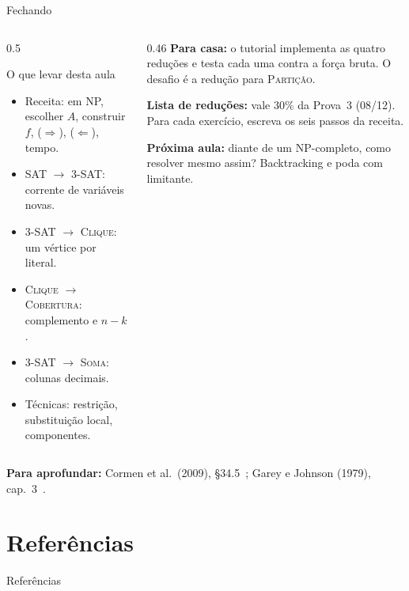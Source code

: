\documentclass[aspectratio=169,xcolor=table]{beamer}
\newcommand{\fonte}[1]{%
  \vfill
  {\tiny\color{gray!55!black}\textbf{Para aprofundar:} #1\par}%
}
\newcommand{\prob}[1]{\textsc{#1}}
\begin{document}
\begin{frame}{Fechando}
  \begin{columns}[T]
    \begin{column}{0.5\textwidth}
      \begin{block}{O que levar desta aula}
        \scriptsize
        \begin{itemize}
          \item Receita: em NP, escolher $A$, construir $f$, ($\Rightarrow$), ($\Leftarrow$),
                tempo.
          \item \prob{SAT} $\to$ \prob{3-SAT}: corrente de variáveis novas.
          \item \prob{3-SAT} $\to$ \prob{Clique}: um vértice por literal.
          \item \prob{Clique} $\to$ \prob{Cobertura}: complemento e $n - k$.
          \item \prob{3-SAT} $\to$ \prob{Soma}: colunas decimais.
          \item Técnicas: restrição, substituição local, componentes.
        \end{itemize}
      \end{block}
    \end{column}
    \begin{column}{0.46\textwidth}
      \scriptsize
      \textbf{Para casa:} o tutorial implementa as quatro reduções e testa cada uma contra a
      força bruta. O desafio é a redução para \prob{Partição}.
      \medskip

      \textbf{Lista de reduções:} vale 30\% da Prova~3 (08/12). Para cada exercício,
      escreva os seis passos da receita.
      \medskip

      \textbf{Próxima aula:} diante de um NP-completo, como resolver mesmo assim?
      Backtracking e poda com limitante.
    \end{column}
  \end{columns}
  \fonte{Cormen et al.\ (2009), \S 34.5~\cite{cormen2009introduction};
    Garey e Johnson (1979), cap.~3~\cite{garey1979computers}.}
\end{frame}

\section*{Referências}
\begin{frame}[allowframebreaks]{Referências}
  \tiny
  \nocite{*}
  
  
\end{frame}
\end{document}

